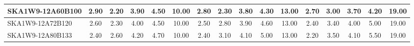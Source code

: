\begin{table}[H]
{{\begin{tabular}{|lccccc||ccccc||ccccc|}
SKA1W9-12A60B100 & 2.90 \cellcolor{blue!53.00} & 2.20 \cellcolor{red!18.00} & 3.90 \cellcolor{green!32.00} & 4.50 \cellcolor{orange!34.80} & 10.00 \cellcolor{purple!60.00} & 2.80 \cellcolor{blue!46.00} & 2.30 \cellcolor{red!23.25} & 3.80 \cellcolor{green!25.00} & 4.30 \cellcolor{orange!27.33} & 13.00 \cellcolor{purple!18.00} & 2.70 \cellcolor{blue!44.25} & 3.00 \cellcolor{red!32.00} & 3.70 \cellcolor{green!26.40} & 4.20 \cellcolor{orange!23.60} & 19.00 \cellcolor{purple!60.00}\\ \hline 
SKA1W9-12A72B120 & 2.60 \cellcolor{blue!32.00} & 2.30 \cellcolor{red!21.00} & 4.00 \cellcolor{green!36.67} & 4.50 \cellcolor{orange!34.80} & 10.00 \cellcolor{purple!60.00} & 2.50 \cellcolor{blue!25.00} & 2.80 \cellcolor{red!36.37} & 3.90 \cellcolor{green!32.00} & 4.60 \cellcolor{orange!41.33} & 13.00 \cellcolor{purple!18.00} & 2.40 \cellcolor{blue!28.50} & 3.40 \cellcolor{red!46.00} & 4.00 \cellcolor{green!51.60} & 5.00 \cellcolor{orange!46.00} & 19.00 \cellcolor{purple!60.00}\\ \hline 
SKA1W9-12A80B133 & 2.40 \cellcolor{blue!18.00} & 2.60 \cellcolor{red!30.00} & 4.20 \cellcolor{green!46.00} & 4.70 \cellcolor{orange!51.60} & 10.00 \cellcolor{purple!60.00} & 2.40 \cellcolor{blue!18.00} & 3.10 \cellcolor{red!44.25} & 4.10 \cellcolor{green!46.00} & 5.00 \cellcolor{orange!60.00} & 13.00 \cellcolor{purple!18.00} & 2.20 \cellcolor{blue!18.00} & 3.50 \cellcolor{red!49.50} & 4.10 \cellcolor{green!60.00} & 5.50 \cellcolor{orange!60.00} & 19.00 \cellcolor{purple!60.00}\\ \hline 
\end{tabular}}
\vspace{-0.300000cm}
\hspace{1cm} 
}
\end{table}
